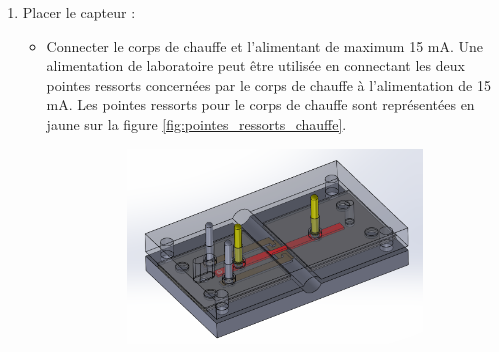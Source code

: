 \begin{enumerate}

    \item Placer le capteur :
          \begin{itemize}
              \item Connecter le corps de chauffe et l'alimentant de maximum 15 mA. Une alimentation de laboratoire peut être utilisée en connectant
                    les deux pointes ressorts concernées par le corps de chauffe à l'alimentation de 15 mA. Les pointes ressorts pour le corps de chauffe
                    sont représentées en jaune sur la figure \ref*{fig:pointes_ressorts_chauffe}.
                    \begin{figure}[H]
                        \centering
                        \begin{subfigure}[b]{0.45\textwidth}
                            \includegraphics[scale = 0.3]{assets/figures/pointes_ressorts_chauffe.png}
                        \end{subfigure}
                        \begin{subfigure}{0.45\textwidth}

\end{subfigure}
\end{figure}
\end{itemize}
\end{enumerate}

